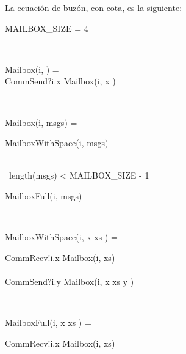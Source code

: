 La ecuación de buzón, con cota, es la siguiente:

\begin{process}

\begin{block}
MAILBOX\_SIZE = 4
\end{block} \\

\begin{block}
Mailbox(i, \nil) = {} \\ \quad
CommSend?i.x \then Mailbox(i, \lseq x \rseq) 
\end{block} \\

\begin{block}
Mailbox(i, msgs) = {} \\ \quad
  \begin{block} \quad

    \begin{block} 
      MailboxWithSpace(i, msgs)
    \end{block} \\
       {} \lceil\ length(msgs) < MAILBOX\_SIZE - 1\ \rceil  \\ \quad

    \begin{block}
      MailboxFull(i, msgs)
    \end{block}

  \end{block} 
\end{block} \\

\begin{block}
MailboxWithSpace(i, \lseq x \rseq \cat xs ) = {} \\ \quad 
  \begin{block}
    CommRecv!i.x \then Mailbox(i, xs) \\
    \Extchoice \\
    CommSend?i.y \then Mailbox(i, \lseq x \rseq \cat xs \cat \lseq y \rseq ) 
  \end{block}
\end{block} \\

\begin{block}
MailboxFull(i, \lseq x \rseq \cat xs ) = {} \\ \quad 
  \begin{block}
    CommRecv!i.x \then Mailbox(i, xs) \\
  \end{block}
\end{block} \\
\end{process}

